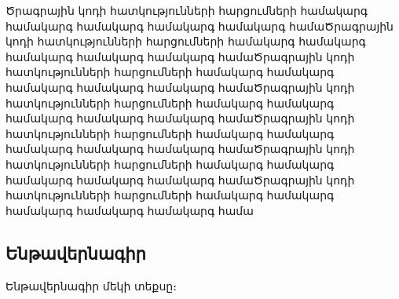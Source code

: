 \justifying
Ծրագրային կոդի հատկությունների հարցումների համակարգ համակարգ համակարգ համակարգ համակարգ համաԾրագրային կոդի հատկությունների հարցումների համակարգ համակարգ համակարգ համակարգ համակարգ համաԾրագրային կոդի հատկությունների հարցումների համակարգ համակարգ համակարգ համակարգ համակարգ համաԾրագրային կոդի հատկությունների հարցումների համակարգ համակարգ համակարգ համակարգ համակարգ համաԾրագրային կոդի հատկությունների հարցումների համակարգ համակարգ համակարգ համակարգ համակարգ համաԾրագրային կոդի հատկությունների հարցումների համակարգ համակարգ համակարգ համակարգ համակարգ համաԾրագրային կոդի հատկությունների հարցումների համակարգ համակարգ համակարգ համակարգ համակարգ համա

	\subsection{\textbf{Ենթավերնագիր}}

	Ենթավերնագիր մեկի տեքսը\cite{example-article}։

